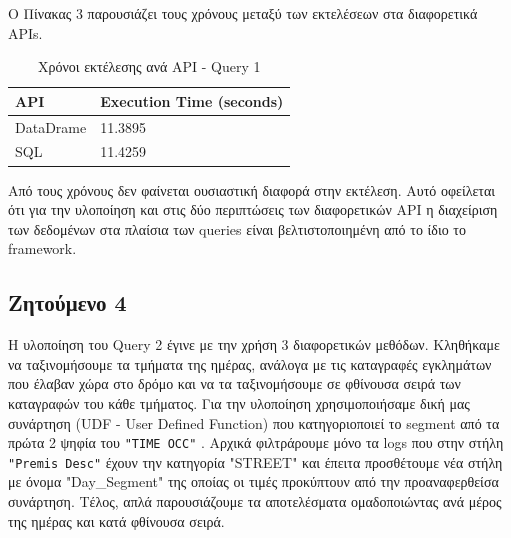 \documentclass{article}
\begin{document}
Ο Πίνακας 3 παρουσιάζει τους χρόνους μεταξύ των εκτελέσεων στα διαφορετικά  APIs. 
\begin{table}[h]
\centering
\begin{tabular}{|l|l|}
\hline
\textbf{API}    & \textbf{Execution Time (seconds)} \\ \hline
DataDrame       & 11.3895                           \\ \hline
SQL             & 11.4259                           \\ \hline
\end{tabular}
\caption{ Χρόνοι εκτέλεσης ανά API - Query 1}
\label{table:execution_times}
\end{table}

Από τους χρόνους δεν φαίνεται ουσιαστική διαφορά στην εκτέλεση. Αυτό οφείλεται ότι για την υλοποίηση και στις δύο περιπτώσεις των διαφορετικών  API  η διαχείριση των δεδομένων στα πλαίσια των queries είναι βελτιστοποιημένη από το ίδιο το framework.


\subsection{Ζητούμενο 4}
\label{subsec:Z4}

Η υλοποίηση του  Query 2  έγινε με την χρήση 3 διαφορετικών μεθόδων. Κληθήκαμε να ταξινομήσουμε τα τμήματα της ημέρας, ανάλογα με τις καταγραφές εγκλημάτων που έλαβαν χώρα στο δρόμο και να τα ταξινομήσουμε σε φθίνουσα σειρά των καταγραφών του κάθε τμήματος. Για την υλοποίηση χρησιμοποιήσαμε δική μας συνάρτηση (UDF - User Defined Function)  που κατηγοριοποιεί το 
segment  από τα πρώτα 2 ψηφία του  \texttt{"TIME OCC"} . Αρχικά φιλτράρουμε μόνο τα  logs  που στην στήλη  \texttt{"Premis Desc"}  έχουν την κατηγορία "STREET" και έπειτα προσθέτουμε νέα στήλη με όνομα "Day\_Segment"  της οποίας οι τιμές προκύπτουν από την προαναφερθείσα συνάρτηση. Τέλος, απλά παρουσιάζουμε τα αποτελέσματα ομαδοποιώντας ανά μέρος της ημέρας και κατά φθίνουσα σειρά.\\
\end{document}
